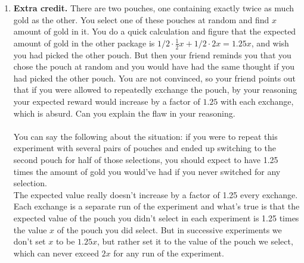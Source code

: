 \documentclass[11pt,fleqn]{article}
\begin{document}
\begin{enumerate}
\newpage
\item \textbf{Extra credit.} There are two pouches, one containing exactly twice as much gold as the other. 
You select one of these pouches at random and find $x$ amount of gold in it. You do a quick calculation
and figure that the expected amount of gold in the other package is $1/2 \cdot \frac 12 x + 1/2 \cdot 2x = 1.25 x$,
and wish you had picked the other pouch. But then your friend reminds you that you chose the pouch at random 
and you would have had the same thought if you had picked the other pouch. You are not convinced, so
your friend points out that if you were allowed to repeatedly exchange the pouch, by your reasoning your expected reward 
would increase by a factor of $1.25$ with each exchange, which is absurd. Can you explain the flaw in 
your reasoning. \\\\

You can say the following about the situation: if you were to repeat this experiment with several pairs of pouches and ended up switching to the second pouch for half of those selections, you should expect to have 1.25 times the amount of gold you would've had if you never switched for any selection. \\
The expected value really doesn't increase by a factor of 1.25 every exchange. Each exchange is a separate run of the experiment and what's true is that the expected value of the pouch you didn't select in each experiment is 1.25 times the value $x$ of the pouch you did select. But in successive experiments we don't set $x$ to be $1.25x$, but rather set it to the value of the pouch we select, which can never exceed $2x$ for any run of the experiment.

\end{enumerate}
\end{document}
